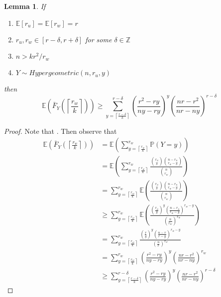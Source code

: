 \documentclass[10pt]{extarticle}
\newcommand{\Z}{\mathbb{Z}}
\newtheorem{lemma}[theorem]{Lemma}
\theoremstyle{definition}
\begin{document}
\begin{lemma}
    \label{lemma:tail-expectation}
        If \begin{enumerate}
            \item $\mathbb{E}[r_u] = \mathbb{E}[r_w] = r$
            \item $r_u, r_w \in [r-\delta,r+\delta]$ for some $\delta \in \Z$
            \item $n > kr^2/r_w$
            \item $Y \sim Hypergeometric(n, r_u, y)$
        \end{enumerate} then $$\mathbb{E} \left( \bar{F}_Y\left(\left\lceil \frac{r_w}{k} \right\rceil\right) \right) \ge \sum_{y = \left\lceil \frac{r-\delta}{k} \right\rceil}^{r-\delta}
        \left(\frac{r^2 - ry}{ny-ry}\right)^{y} \left(\frac{nr-r^2}{nr-ny}\right)^{r-\delta}$$
    \end{lemma}
    \begin{proof}
        Note that . Then observe that
        \begin{equation}
        \begin{split}
            \mathbb{E} \left( \bar{F}_Y\left(\left\lceil \frac{r_w}{k} \right\rceil\right) \right) &=
            \mathbb{E} \left( \sum_{y = \left\lceil \frac{r_w}{k} \right\rceil}^{r_w} \mathbb{P}(Y=y) \right) \\ &= \mathbb{E}  \left( \sum_{y = \left\lceil \frac{r_w}{k} \right\rceil}^{r_w} \frac{\binom{r_u}{y} \binom{n-r_u}{r_w-y}}{\binom{n}{r_w}} \right) \\ &=  \sum_{y = \left\lceil \frac{r_w}{k} \right\rceil}^{r_w} \mathbb{E} \left(\frac{\binom{r_u}{y} \binom{n-r_u}{r_w-y}}{\binom{n}{r_w}}  \right) \\ &\ge \sum_{y = \left\lceil \frac{r_w}{k} \right\rceil}^{r_w} \mathbb{E} 
            \left(
                \frac
                {
                    \left(\frac{r_u}{y}\right)^{y} \left(\frac{n-r_u}{r_w - y}\right)^{r_w-y}
                }
                {
                    \left(\frac{n}{r_w}\right)^{r_w}
                }  
            \right) \\ &= 
            \sum_{y = \left\lceil \frac{r_w}{k} \right\rceil}^{r_w}
                \frac
                {
                    \left(\frac{r}{y}\right)^{y} \left(\frac{n-r}{r - y}\right)^{r_w-y}
                }
                {
                    \left(\frac{n}{r}\right)^{r_w}
                } 
                \\ &=
                \sum_{y = \left\lceil \frac{r_w}{k} \right\rceil}^{r_w}
                    \left(\frac{r^2 - ry}{ny-ry}\right)^{y} \left(\frac{nr-r^2}{nr-ny}\right)^{r_w}
                \\ &\ge
                \sum_{y = \left\lceil \frac{r-\delta}{k} \right\rceil}^{r-\delta}
                    \left(\frac{r^2 - ry}{ny-ry}\right)^{y} \left(\frac{nr-r^2}{nr-ny}\right)^{r-\delta}
        \end{split}
    \end{equation}
    \end{proof}
\end{document}
